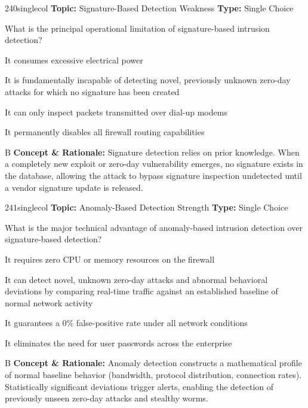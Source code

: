 \begin{qcard}{240}{singlecol}
\textcolor{darkslate!75}{\small\textbf{Topic:} Signature-Based Detection Weakness \hfill \textbf{Type:} Single Choice}\vspace{0.4em}\par
What is the principal operational limitation of signature-based intrusion detection?
\begin{qoptions}
\item It consumes excessive electrical power
\item It is fundamentally incapable of detecting novel, previously unknown zero-day attacks for which no signature has been created
\item It can only inspect packets transmitted over dial-up modems
\item It permanently disables all firewall routing capabilities
\end{qoptions}
\end{qcard}
\nopagebreak
\begin{explainbox}{B}
\textbf{Concept \& Rationale:} Signature detection relies on prior knowledge. When a completely new exploit or zero-day vulnerability emerges, no signature exists in the database, allowing the attack to bypass signature inspection undetected until a vendor signature update is released.
\end{explainbox}

\begin{qcard}{241}{singlecol}
\textcolor{darkslate!75}{\small\textbf{Topic:} Anomaly-Based Detection Strength \hfill \textbf{Type:} Single Choice}\vspace{0.4em}\par
What is the major technical advantage of anomaly-based intrusion detection over signature-based detection?
\begin{qoptions}
\item It requires zero CPU or memory resources on the firewall
\item It can detect novel, unknown zero-day attacks and abnormal behavioral deviations by comparing real-time traffic against an established baseline of normal network activity
\item It guarantees a 0\% false-positive rate under all network conditions
\item It eliminates the need for user passwords across the enterprise
\end{qoptions}
\end{qcard}
\nopagebreak
\begin{explainbox}{B}
\textbf{Concept \& Rationale:} Anomaly detection constructs a mathematical profile of normal baseline behavior (bandwidth, protocol distribution, connection rates). Statistically significant deviations trigger alerts, enabling the detection of previously unseen zero-day attacks and stealthy worms.
\end{explainbox}

